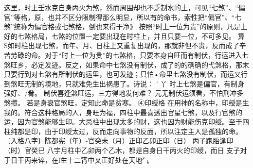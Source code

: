 这里，时上壬水克自身丙火为煞，然而周围却也不乏制水的土，可见“七煞”、“偏官”等格，原，也并不区分限制得那么明显，所以有的命书，索性把“偏官”、“七煞”统称为偏官格或七煞格，倒也来得干净》
按照“时上一位为贵”的原则，凡是上好的七煞格局，七煞的位置一定要出现在时柱上，并且只要一位，不可多见。
算
S如时柱出现七煞，而年、月、日柱上又重复出现的，那就非但不贵，反而成了辛苦劳碌的命。对于“时上一位为贵”的七煞格，只要本身自旺而有制伏，行运进入七煞旺乡，必定发迹。反之，如果命中七煞没有制伏，成了的的确确的弋煞格，那末只要行到对七煞有所制伏的运里，也可发迹；只怕•命里七煞没有制伏，而运又行到煞旺无制的境地，只就难免生出祸患了。诗说：	'	丫
时上七煞是偏官，有制身强好、/肴。
制伏喜逢煞旺运，三方得地发何难？
元无制伏运须看，不怕刑冲多煞攒。
若是身衰官煞旺，定知此命是贫寒。
④印绶格
在用神的名称中，印绶是生我的。符合这种格局的人，身旺为福，四柱中最喜透出官星七煞，以及行官煞的运，因为官煞能够生印。大忌柱中出现太多的财，这也因为财能伤克印绶。至于四柱纯都是印，由于印绶太过，反而走向事物的反面，所以注定主人是孤独的命。
〔入格八字〕陈都宪（年）-官癸未（月）正印乙卯正印（日）	丙子跑胎逢印
（时）官癸巳
八宇月柱中乙卯两个乙木，都是自身日干丙火的印绶，而日
支子对于日干丙来谇，在f生十二宵中叉正好处在天地气

